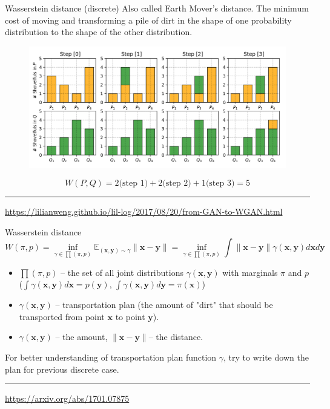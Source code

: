 \documentclass{beamer}
\newcommand{\bx}{\mathbf{x}}
\newcommand{\by}{\mathbf{y}}
\newcommand{\bbE}{\mathbb{E}}
\begin{document}
\begin{frame}{Wasserstein distance (discrete)}
	Also called Earth Mover's distance.
	The minimum cost of moving and transforming a pile of dirt in the shape of one probability distribution to the shape of the other distribution.
	\begin{figure}
		\centering
		\includegraphics[width=.9\linewidth]{figs/EM_distance_discrete}
	\end{figure}
	\[
		W(P, Q) = 2 \text{(step 1)} + 2 \text{(step 2)} + 1 \text{(step 3)}  = 5
	\]
	\vfill
	\hrule\medskip 
	{\scriptsize \href{https://lilianweng.github.io/lil-log/2017/08/20/from-GAN-to-WGAN.html}{https://lilianweng.github.io/lil-log/2017/08/20/from-GAN-to-WGAN.html}}
	
\end{frame}
\begin{frame}{Wasserstein distance}
	\[
		W(\pi, p) = \inf_{\gamma \in \prod(\pi, p)} \bbE_{(\bx, \by) \sim \gamma} \| \bx - \by \| =  \inf_{\gamma \in \prod(\pi, p)} \int \| \bx - \by \| \gamma (\bx, \by) d \bx d \by
	\]
	\begin{itemize}
		\item $\prod(\pi, p)$ -- the set of all joint distributions $\gamma (\bx, \by)$ with marginals $\pi$ and $p$ ($\int \gamma(\bx, \by) d \bx = p(\by)$, $\int \gamma(\bx, \by) d \by = \pi(\bx)$)
		\item $\gamma(\bx, \by)$ -- transportation plan (the amount of "dirt" that should be transported from point $\bx$ to point $\by$).
		\item $\gamma(\bx, \by)$ -- the amount, $\|\bx - \by \|$-- the distance.
	\end{itemize}
	For better understanding of transportation plan function $\gamma$, try to write down the plan for previous discrete case.
	\vfill
	\hrule\medskip 
	{\scriptsize \href{https://arxiv.org/abs/1701.07875}{https://arxiv.org/abs/1701.07875}}
\end{frame}
\end{document}
